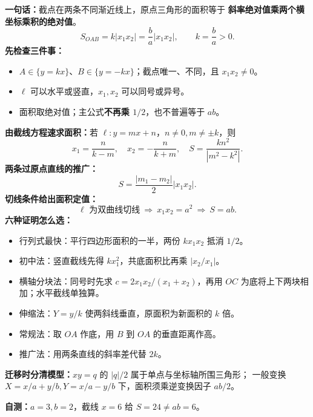 \clearpage
\begin{summarybox}
\textbf{一句话：}截点在两条不同渐近线上，原点三角形的面积等于
\textbf{斜率绝对值乘两个横坐标乘积的绝对值}。
\[
\boxed{S_{OAB}=k|x_1x_2|=\frac ba|x_1x_2|},\qquad k=\frac ba>0.
\]
\textbf{先检查三件事：}
\begin{itemize}[leftmargin=*,itemsep=.25em]
\item $A\in\{y=kx\}$、$B\in\{y=-kx\}$；截点唯一、不同，且 $x_1x_2\ne0$。
\item $\ell$ 可以水平或竖直，$x_1,x_2$ 可以同号或异号。
\item 面积取绝对值；主公式\textbf{不再乘 $1/2$}，也不普遍等于 $ab$。
\end{itemize}
\textbf{由截线方程速求面积：}若 $\ell:y=mx+n$，$n\ne0,m\ne\pm k$，则
\[
 x_1=\frac{n}{k-m},\quad x_2=-\frac{n}{k+m},\quad
 \boxed{S=\frac{kn^2}{|m^2-k^2|}}.
\]
\textbf{两条过原点直线的推广：}
\[
\boxed{S=\frac{|m_1-m_2|}{2}|x_1x_2|}.
\]
\textbf{切线条件给出面积定值：}
\[
\boxed{\ell\text{ 为双曲线切线}\ \Longrightarrow\ x_1x_2=a^2\ \Longrightarrow\ S=ab}.
\]
\textbf{六种证明怎么选：}
\begin{itemize}[leftmargin=*,itemsep=.18em]
\item 行列式最快：平行四边形面积的一半，两份 $kx_1x_2$ 抵消 $1/2$。
\item 初中法：竖直截线先得 $kx_1^2$，共底面积比再乘 $|x_2/x_1|$。
\item 横轴分块法：同号时先求 $c=2x_1x_2/(x_1+x_2)$，再用 $OC$ 为底将上下两块相加；水平截线单独算。
\item 伸缩法：$Y=y/k$ 使两斜线垂直，原面积为新面积的 $k$ 倍。
\item 常规法：取 $OA$ 作底，用 $B$ 到 $OA$ 的垂直距离作高。
\item 推广法：用两条直线的斜率差代替 $2k$。
\end{itemize}
\textbf{迁移时分清模型：}$xy=q$ 的 $|q|/2$ 属于单点与坐标轴所围三角形；
一般变换 $X=x/a+y/b,Y=x/a-y/b$ 下，面积须乘逆变换因子 $ab/2$。

\textbf{自测：}$a=3,b=2$，截线 $x=6$ 给 $S=24\ne ab=6$。
\end{summarybox}
